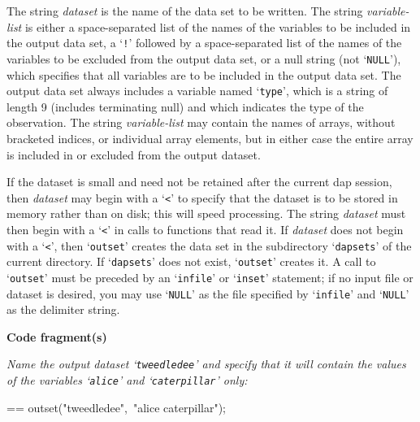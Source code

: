 \documentclass{book}
\makeatletter
\newcommand\Texinfocommandstyletextvar[1]{{\normalfont{}\textsl{#1}}}%
\newenvironment{Texinfopreformatted}{%
  \par\GNUTobeylines\obeyspaces\frenchspacing\parskip=\z@\parindent=\z@}{}
{\catcode`\^^M=13 \gdef\GNUTobeylines{\catcode`\^^M=13 \def^^M{\null\par}}}
\newenvironment{Texinfoindented}{\begin{list}{}{}\item\relax}{\end{list}}
\renewcommand{\_}{\Texinfounderscore\discretionary{}{}{}}
\makeatother
\begin{document}
The string \Texinfocommandstyletextvar{dataset} is the name of the data set to be written.
The string \Texinfocommandstyletextvar{variable-list}
is either a space-separated list of the names of the variables
to be included in the output data set,
a `\texttt{!}' followed by a space-separated list of the names of the variables
to be excluded from the output data set,
or a null string (not `\texttt{NULL}'), which
specifies that all variables are to be included in the output data set.
The output data set always includes a variable named `\texttt{\_type\_}', which
is a string of length 9 (includes terminating null) and
\index[in]{\_type\_@\_type\_}%
%
which indicates the type of the observation.
The string \Texinfocommandstyletextvar{variable-list} may contain the names of arrays, without bracketed indices,
or individual array elements, but in either case the entire array is included
in or excluded from the output dataset.

If the dataset
%
%
%
is small and need not be retained after the current dap session,
then \Texinfocommandstyletextvar{dataset} may begin with a `\texttt{<}' to specify that the dataset is
to be stored in memory rather than on disk; this will speed processing.
The string \Texinfocommandstyletextvar{dataset} must then begin with a `\texttt{<}' in calls to functions that
read it.
If \Texinfocommandstyletextvar{dataset} does not begin with a `\texttt{<}', then
`\texttt{outset}' creates the data set in the subdirectory
`\texttt{dap\_sets}'
%
\index[in]{dap\_sets@dap\_sets}%
of the current directory.  If
`\texttt{dap\_sets}' does not exist, `\texttt{outset}' creates it.
A call to `\texttt{outset}' must be preceded by an
`\texttt{infile}' or `\texttt{inset}' statement;
if no input file or dataset is desired, you may use
`\texttt{NULL}' as the file specified by `\texttt{infile}' and `\texttt{NULL}' as the delimiter string.

\noindent{}\textbf{Code fragment(s)}

\emph{Name the output dataset `\texttt{tweedledee}' and
specify that it will contain the values of the variables
`\texttt{alice}' and `\texttt{caterpillar}' only:}
\begin{Texinfoindented}
\begin{Texinfopreformatted}%
\ttfamily outset("tweedledee",\ "alice caterpillar");
\end{Texinfopreformatted}
\end{Texinfoindented}
\end{document}
